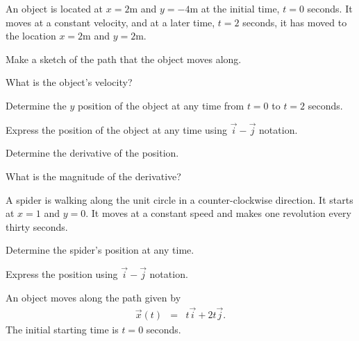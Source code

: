 \begin{problem}
\item An object is located at $x=2$m and $y=-4$m at the initial time,
  $t=0$ seconds. It moves at a constant velocity, and at a later time,
  $t=2$ seconds, it has moved to the location $x=2$m and $y=2$m.
  \begin{subproblem}
  \item Make a sketch of the path that the object moves along.
    \vfill
  \item What is the object's velocity?
    \vspace{3em}
  \item Determine the $y$ position of the object at any time from
    $t=0$ to $t=2$ seconds.
    \vfill
  \item Express the position of the object at any time using
    $\vec{i}-\vec{j}$ notation.
    \vspace{3em}
  \item Determine the derivative of the position.
    \vfill
  \item What is the magnitude of the derivative?
    \vfill

  \clearpage

  \end{subproblem}

  \clearpage

\item A spider is walking along the unit circle in a counter-clockwise
  direction. It starts at $x=1$ and $y=0$. It moves at a constant
  speed and makes one revolution every thirty seconds.

  \scalebox{0.35}{}

  \begin{subproblem}
  \item Determine the spider's position at any time.
    \vfill
  \item Express the position using $\vec{i}-\vec{j}$ notation.
    \vspace{5em}
  \end{subproblem}

  \clearpage


\item An object moves along the path given by
  \begin{eqnarray*}
    \vec{x}(t) & = & t \vec{i} + 2 t \vec{j}.
  \end{eqnarray*}
  The initial starting time is $t=0$ seconds.


\end{problem}
